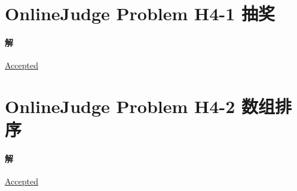 \documentclass{article}
\begin{document}
\section{OnlineJudge Problem H4-1 抽奖}

\paragraph{解}
\href{https://202.38.86.171/status/829aee86f921ebd694c0d52303582a55}{\underline{Accepted}}
\\

\section{OnlineJudge Problem H4-2 数组排序}

\paragraph{解}
\href{https://202.38.86.171/status/7ea7548feef36a762b4a53e940d47aba}{\underline{Accepted}}
\\
\end{document}
